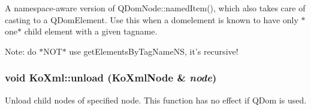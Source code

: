 \label{namespaceKoXml_af571b501c9481cab08bbcf9b9174e4f5}
A namespace-\/aware version of QDomNode::namedItem(), which also takes care of casting to a QDomElement. Use this when a domelement is known to have only $\ast$one$\ast$ child element with a given tagname.

Note: do $\ast$NOT$\ast$ use getElementsByTagNameNS, it's recursive! \hypertarget{namespaceKoXml_a5834f749393cb5393257558484f8d2b9}{
\subsubsection[{unload}]{\setlength{\rightskip}{0pt plus 5cm}void KoXml::unload ({\bf KoXmlNode} \& {\em node})}}
\label{namespaceKoXml_a5834f749393cb5393257558484f8d2b9}
Unload child nodes of specified node. This function has no effect if QDom is used. 